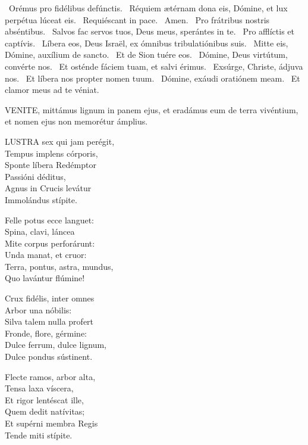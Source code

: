 \V\ Orémus pro fidélibus defúnctis. \R\ Réquiem ætérnam dona eis, Dómine, et lux perpétua lúceat eis. \V\ Requiéscant in pace. \R\ Amen. \V\ Pro frátribus nostris abséntibus. \R\ Salvos fac servos tuos, Deus meus, sperántes in te. \V\ Pro afflíctis et captívis. \R\ Líbera eos, Deus Israël, ex ómnibus tribulatiónibus suis. \V\ Mitte eis, Dómine, auxílium de sancto. \R\ Et de Sion tuére eos. \V\ Dómine, Deus virtútum, convérte nos. \R\ Et osténde fáciem tuam, et salvi érimus. \V\ Exsúrge, Christe, ádjuva nos. \R\ Et líbera nos propter nomen tuum. \V\ Dómine, exáudi oratiónem meam. \R\ Et clamor meus ad te véniat.



\lettrine[lines=2]{V}{ENITE}, mittámus lignum in panem ejus, et eradámus eum de terra vivéntium, et nomen ejus non memorétur ámplius.


\lettrine[lines=2]{L}{USTRA} sex qui jam perégit,\\
Tempus implens córporis,\\
Sponte líbera Redémptor\\
Passióni déditus,\\
Agnus in Crucis levátur\\
Immolándus stípite.

Felle potus ecce languet:\\
Spina, clavi, láncea\\
Mite corpus perforárunt:\\
Unda manat, et cruor:\\
Terra, pontus, astra, mundus,\\
Quo lavántur flúmine!

Crux fidélis, inter omnes\\
Arbor una nóbilis:\\
Silva talem nulla profert\\
Fronde, flore, gérmine:\\
Dulce ferrum, dulce lignum,\\
Dulce pondus sústinent.

Flecte ramos, arbor alta,\\
Tensa laxa víscera,\\
Et rigor lentéscat ille,\\
Quem dedit natívitas;\\
Et supérni membra Regis\\
Tende miti stípite.

